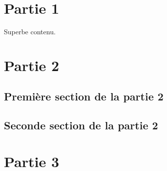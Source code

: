 \chapter{Partie 1}

Superbe contenu.
\lipsum

\chapter{Partie 2}

\lipsum

\section{Première section de la partie 2}
\lipsum

\section{Seconde section de la partie 2}
\lipsum

\chapter{Partie 3}
\lipsum
